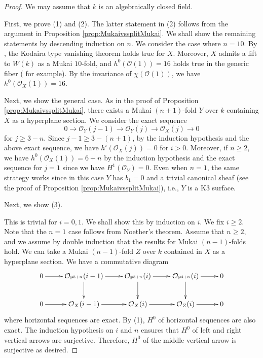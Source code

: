 \documentclass[autodetect-engine, a4paper]{amsart}
\theoremstyle{definition}
\def\P{{\mathbb P}}
\def\cO{\mathcal{O}}
\newcommand{\cred}{\color{black}}
\newcommand{\cora}{\color{black}}
\begin{document}
\begin{proof}
{\cora  We may assume that $k$ is an algebraically closed field.}

First, we prove (1) and (2).
{\cora 
The latter statement in (2) follows from the argument in Proposition \ref{prop:MukaivssplitMukai}.
We shall show the remaining statements by descending induction on $n$.}
We consider the case where $n=10$. 
By \cite[Proposition 2 and Theorem 2]{Mehta-Ramanathan}, the Kodaira type vanishing theorem holds true for $X$.
Moreover, $X$ admits a lift to $W(k)$ as a Mukai $10$-fold, and $h^0(\cO(1)) =16$ holds true in the generic fiber (\cite[Subsection 2.2]{Kuznetsovspinor} for example).
By the invariance of $\chi(\cO (1))$, we have $h^0(\cO_{X}(1)) =16$.

Next, we show the general case.
{\cred As in the proof of Proposition \ref{prop:MukaivssplitMukai}, there exists a Mukai $(n+1)$-fold $Y$ over $k$ containing $X$ as a hyperplane section.}
We consider the exact sequence
\[
0 \rightarrow  \cO_{Y} (j-1) \rightarrow \cO_{Y}(j)  \rightarrow \cO_{X} (j) \rightarrow 0
\]
for $j \geq 3-n$.
Since $j-1 \geq 3-(n+1)$, by the induction hypothesis and the above exact sequence, we have $h^i (\cO_{X} (j)) =0$ for $i>0.$
Moreover, if $n \geq 2$, we have $h^0 (\cO_{X} (1)) =6+n$ by the induction hypothesis and the exact sequence for $j=1$ since we have $H^1 (\cO_{Y}) =0$.
Even when $n=1$, the same strategy works since in this case $Y$ has $b_{1} =0$ and a trivial canonical sheaf (see the proof of Proposition \ref{prop:MukaivssplitMukai}), i.e., $Y$ is a K3 surface.

Next, we show (3).
{\cred
This is trivial for $i=0,1$.
We shall show this by induction on $i$. We fix $i\geq 2$.
Note that the $n=1$ case follows from Noether's theorem. 
Assume that $n\geq 2$, and we assume by double induction that
the results for Mukai $(n-1)$-folds hold.
We can take a Mukai $(n-1)$-fold $Z$ over $k$ contained in $X$ as a hyperplane section.
We have a commutative diagram
\[
\xymatrix{
0 \ar[r] & \cO_{\P^{5+n}} (i-1) \ar[r] \ar[d] & \cO_{\P^{5+n}} (i) \ar[r] \ar[d] & \cO_{\P^{4+n}} (i) \ar[d] \ar[r] & 0 \\
0 \ar[r] & \cO_{X}(i-1) \ar[r] & \cO_{X}(i) \ar[r] & \cO_{Z} (i) \ar[r] &0
}
\]
where horizontal sequences are exact.
By (1), $H^0$ of horizontal sequences are also exact.
The induction hypothesis on $i$ and $n$ ensures that $H^0$ of left and right vertical arrows are surjective.
Therefore, $H^0$ of the middle vertical arrow is surjective as desired.

}
\end{proof}
\end{document}
